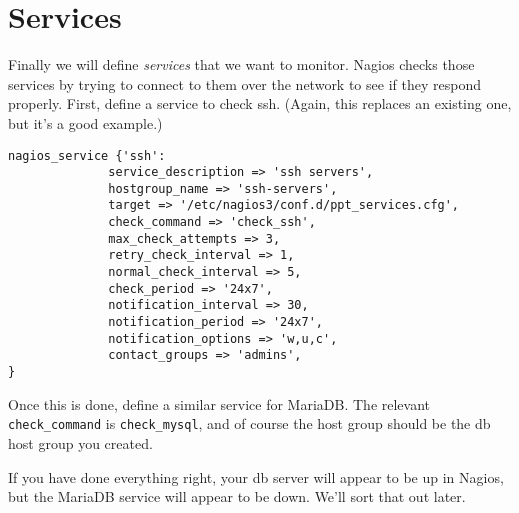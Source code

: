 \documentclass{article}         %
\begin{document}
\newpage

\section{Services}
Finally we will define \emph{services} that we want to monitor. Nagios checks those services by trying to connect to them over the network to see if they respond properly. First, define a service to check ssh. (Again, this replaces an existing one, but it's a good example.)


\begin{verbatim}
nagios_service {'ssh':
              service_description => 'ssh servers',
              hostgroup_name => 'ssh-servers',
              target => '/etc/nagios3/conf.d/ppt_services.cfg',
              check_command => 'check_ssh',
              max_check_attempts => 3,
              retry_check_interval => 1,
              normal_check_interval => 5,
              check_period => '24x7',
              notification_interval => 30,
              notification_period => '24x7',
              notification_options => 'w,u,c',
              contact_groups => 'admins',
}

\end{verbatim}

Once this is done, define a similar service for MariaDB. The relevant \texttt{check\_command} is \texttt{check\_mysql}, and of course the host group should be the db host group you created.


If you have done everything right, your db server will appear to be up in Nagios,
but the MariaDB service will appear to be down. We'll sort that out later.
\end{document}
